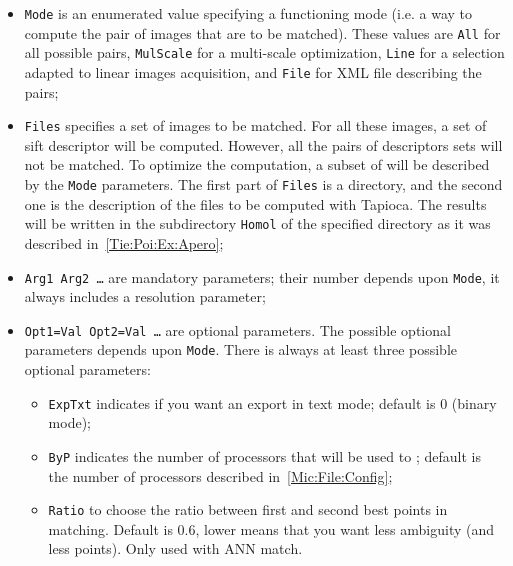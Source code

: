 \begin{itemize}

    \item {\tt Mode} is an enumerated value specifying a functioning mode
	  (i.e. a way to compute the pair of images that are to be matched).
	  These values are {\tt All} for all possible pairs, {\tt MulScale}
	  for a multi-scale optimization, {\tt Line} for a selection adapted
	  to linear images acquisition, and {\tt File} for  XML file
	  describing the pairs;

    \item {\tt Files} specifies a set of images to be matched. For all these
	 images, a set of sift descriptor will be computed. However, all the pairs of
	 descriptors sets will not be  matched. To optimize the computation, a subset
	 of  will be described by the {\tt Mode} parameters.
	 The first part of {\tt Files} is a directory, and the second one is the description
	 of the files to be computed with Tapioca.
	 The results will be written in the subdirectory {\tt Homol} of the
	 specified directory as it was described in~\ref{Tie:Poi:Ex:Apero};



    \item  {\tt Arg1 Arg2  \dots} are mandatory parameters; their number depends
	   upon {\tt Mode}, it always includes a resolution parameter;

    \item  {\tt  Opt1=Val Opt2=Val  \dots} are optional parameters. The possible
	   optional parameters depends upon {\tt Mode}.
	   There is always at least three possible optional parameters:

	    \begin{itemize}
		 \item {\tt ExpTxt} indicates if you want an export in text mode;
		       default is $0$ (binary mode);

		 \item {\tt ByP} indicates the number of processors that will be used
			to ; %
		       default is the number of
			processors described in~\ref{Mic:File:Config};

		 \item {\tt Ratio} to choose the ratio between first and second best points in matching.
		    Default is 0.6, lower means that you want less ambiguity (and less points).
		    Only used with ANN match.

	    \end{itemize}

\end{itemize}

